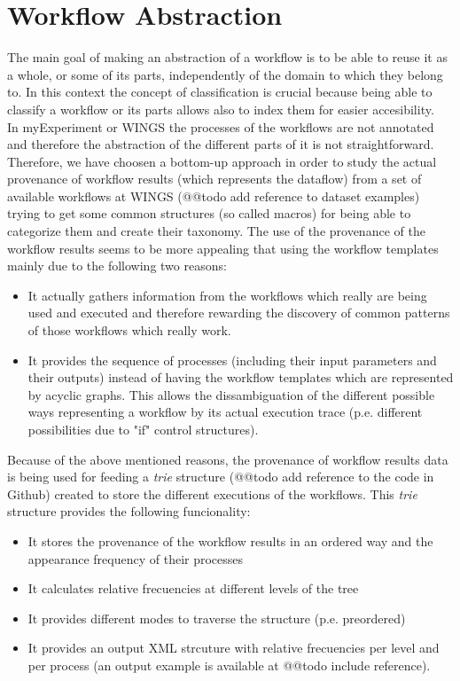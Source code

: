 \section{Workflow Abstraction}

\label{sec:abstraction}
The main goal of making an abstraction of a workflow is to be able to reuse it as a whole, or some of its parts, independently of the domain to which they belong to. In this context the concept of classification is crucial because being able to classify a workflow or its parts allows also to index them for easier accesibility. \\

In myExperiment or WINGS the processes of the workflows are not annotated and therefore the abstraction of the different parts of it is not straightforward. Therefore, we have choosen a bottom-up approach in order to study the actual provenance of workflow results (which represents the dataflow) from a set of available workflows at WINGS (@@todo add reference to dataset examples) trying to get some common structures (so called macros) for being able to categorize them and create their taxonomy. The use of the provenance of the workflow results seems to be more appealing that using the workflow templates mainly due to the following two reasons:

\begin{itemize}
\item It actually gathers information from the workflows which really are being used and executed and therefore rewarding the discovery of common patterns of those workflows which really work.
\item It provides the sequence of processes (including their input parameters and their outputs) instead of having the workflow  templates which are represented by acyclic graphs. This allows the dissambiguation of the different possible ways representing a workflow by its actual execution trace (p.e. different possibilities due to "if" control structures).
\end{itemize}

Because of the above mentioned reasons, the provenance of workflow results data is being used for feeding a \textit{trie} structure (@@todo add reference to the code in Github) created to store the different executions of the workflows. This \textit{trie} structure provides the following funcionality:
\begin{itemize}
\item It stores the provenance of the workflow results in an ordered way and the appearance frequency of their processes
\item It calculates relative frecuencies at different levels of the tree
\item It provides different modes to traverse the structure (p.e. preordered)
\item It provides an output XML strcuture with relative frecuencies per level and per process (an output example is available at @@todo include reference).
\end{itemize}

